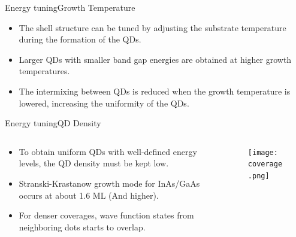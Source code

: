 \documentclass{beamer}
\begin{document}
\begin{frame}{Energy tuning}{Growth Temperature}
    \begin{itemize}
        \item The shell structure can be tuned by adjusting the substrate temperature during the formation of the QDs.
        \item Larger QDs with smaller band gap energies are obtained at higher growth temperatures.
        \item The intermixing between QDs is reduced when the growth temperature is lowered, increasing the uniformity of the QDs.
    \end{itemize}
\end{frame}

\begin{frame}{Energy tuning}{QD Density}
    \begin{columns}
        \begin{column}{0.65\textwidth}
            \begin{itemize}
                \item To obtain uniform QDs with well-defined energy levels, the QD density must be kept low.
                \item Stranski-Krastanow growth mode for InAs/GaAs occurs at about 1.6 ML (And higher).
                \item For denser coverages, wave function states from neighboring dots starts to overlap.
            \end{itemize}
        \end{column}
        \begin{column}{0.40\textwidth}
            \begin{figure}
                \centering
                \texttt{[image: coverage.png]}
                \label{fig:In coverage}
            \end{figure}
        \end{column}

    \end{columns}
\end{frame}
\end{document}
